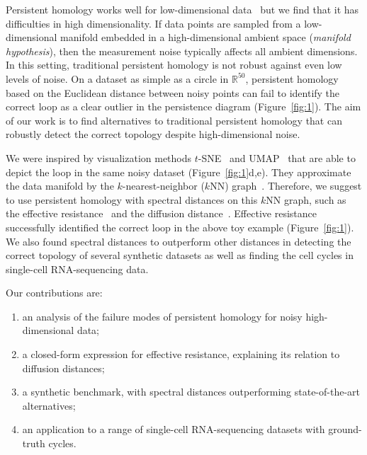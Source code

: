 \documentclass{article}
\theoremstyle{plain}
\theoremstyle{definition}
\theoremstyle{remark}
\begin{document}
Persistent homology works well for low-dimensional data~\citep{turkes2022effectiveness} but we find that it has difficulties in high dimensionality. If data points are sampled from a low-dimensional manifold embedded in a high-dimensional ambient space (\textit{manifold hypothesis}), then the measurement noise typically affects all ambient dimensions. In this setting, traditional persistent homology is not robust against even low levels of noise. On a dataset as simple as a circle in $\mathbb R^{50}$, persistent homology based on the Euclidean distance between noisy points can fail to identify the correct loop as a clear outlier in the persistence diagram (Figure~\ref{fig:1}). The aim of our work is to find alternatives to traditional persistent homology that can robustly detect the correct topology despite high-dimensional noise.

We were inspired by visualization methods $t$-SNE~\citep{van2008visualizing} and UMAP~\citep{mcinnes2018umap} that are able to depict the loop in the same noisy dataset (Figure~\ref{fig:1}d,e). They approximate the data manifold by the $k$-nearest-neighbor ($k$NN) graph~\citep{tenenbaum2000global, roweis2000nonlinear,belkin2001laplacian, hinton2002stochastic,moon2019visualizing}. Therefore, we suggest to use persistent homology with spectral distances on this $k$NN graph, such as the effective resistance~\citep{doyle1984random} and the diffusion distance~\citep{coifman2006diffusion}. Effective resistance successfully identified the correct loop in the above toy example (Figure~\ref{fig:1}). We also found spectral distances to outperform other distances in detecting the correct topology of several synthetic datasets as well as finding the cell cycles in single-cell RNA-sequencing data.

Our contributions are:

\begin{enumerate}[nosep, leftmargin=0.5\leftmargin]%
    \item an analysis of the failure modes of persistent homology for noisy high-dimensional data;
    \item a closed-form expression for effective resistance, explaining its relation to diffusion distances;
    \item a synthetic benchmark, with spectral distances outperforming state-of-the-art alternatives;
    \item an application to a range of single-cell RNA-sequencing datasets with ground-truth cycles.
\end{enumerate}
\end{document}
